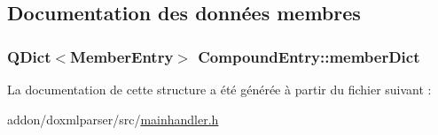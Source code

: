 \subsection{Documentation des données membres}
\hypertarget{struct_compound_entry_a887405905d0ad9d8d2ed65418d1abd96}{}
\subsubsection[{member\+Dict}]{\setlength{\rightskip}{0pt plus 5cm}Q\+Dict$<${\bf Member\+Entry}$>$ Compound\+Entry\+::member\+Dict}\label{struct_compound_entry_a887405905d0ad9d8d2ed65418d1abd96}


La documentation de cette structure a été générée à partir du fichier suivant \+:\begin{DoxyCompactItemize}
\item 
addon/doxmlparser/src/\hyperlink{mainhandler_8h}{mainhandler.\+h}\end{DoxyCompactItemize}
